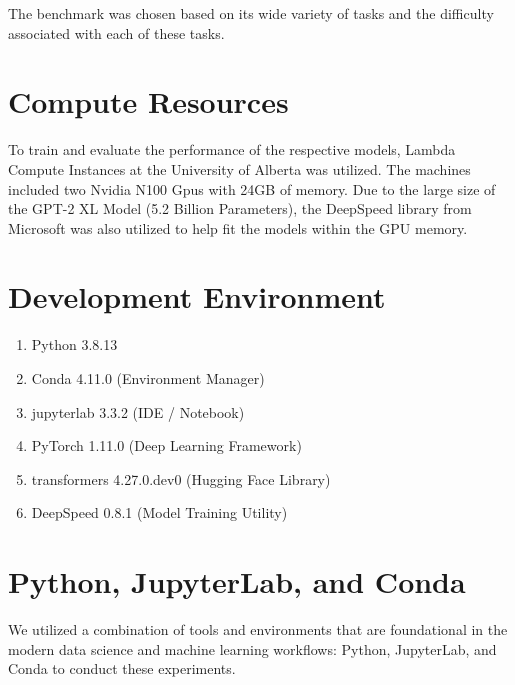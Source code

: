 \documentclass[\main/thesis.tex]{subfiles}
\begin{document}
The benchmark was chosen based on its wide variety of tasks and the difficulty 
associated with each of these tasks. 


\section{Compute Resources}\label{sec:computeResources}
To train and evaluate the performance of the respective models, Lambda Compute Instances at the University of Alberta 
was utilized. The machines included two Nvidia N100 Gpus with 24GB of memory. Due to the large size of the GPT-2 XL 
Model (5.2 Billion Parameters), the DeepSpeed\cite{rajbhandari_zero_2020} library from Microsoft was also utilized to 
help fit the models within the GPU memory. 

\section{Development Environment}
\begin{enumerate}
    \item Python 3.8.13
    \item Conda 4.11.0 (Environment Manager)
    \item jupyterlab 3.3.2 (IDE / Notebook)
    \item PyTorch 1.11.0 (Deep Learning Framework)
    \item transformers 4.27.0.dev0 (Hugging Face Library)
    \item DeepSpeed 0.8.1 (Model Training Utility)
\end{enumerate}


\section{Python, JupyterLab, and Conda}\label{sec:python}

We utilized a combination of tools and environments that are foundational in the modern data science and machine 
learning workflows: Python, JupyterLab, and Conda to conduct these experiments. 
\end{document}
